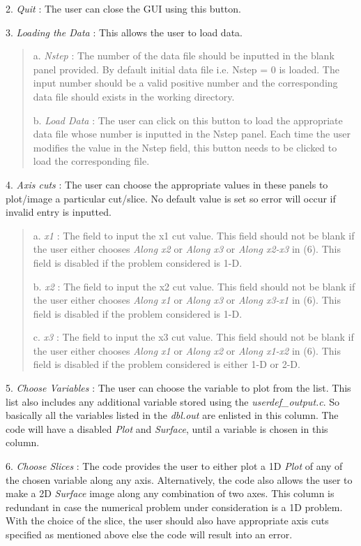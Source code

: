 \documentclass[letterpaper,10pt,english]{sphinxmanual}
\begin{document}
2. \emph{Quit} : The user can close the GUI using this
button.

3. \emph{Loading the Data} :  This allows the user to load
data.
\begin{quote}

a. \emph{Nstep} : The number of the data file should be inputted in the
blank panel provided. By default initial data file i.e. Nstep = 0 is
loaded. The input number should be a valid positive number and the
corresponding data file should exists in the working directory.

b. \emph{Load Data} : The user can click on this button to load the
appropriate data file whose number is inputted in the Nstep
panel. Each time the user modifies the value in the Nstep field, this
button needs to be clicked to load the corresponding file.
\end{quote}

4. \emph{Axis cuts} : The user can choose the appropriate values in these
panels to plot/image a particular cut/slice.
No default value is set so error will occur if invalid entry is inputted.
\begin{quote}

a. \emph{x1} : The field to input the x1 cut value. This field should not be
blank if the user either chooses \emph{Along x2} or \emph{Along x3} or \emph{Along
x2-x3} in (6). This field is disabled if the problem considered is
1-D.

b. \emph{x2} : The field to input the x2 cut value. This field should not
be blank if the user either chooses \emph{Along x1} or \emph{Along x3} or
\emph{Along x3-x1} in (6). This field is disabled if the
problem considered is 1-D.

c. \emph{x3} : The field to input the x3 cut value. This field should not
be blank if the user either chooses \emph{Along x1} or \emph{Along x2} or
\emph{Along x1-x2} in (6).  This field is disabled if the
problem considered is either 1-D or 2-D.
\end{quote}

5. \emph{Choose Variables} : The user can choose the variable to plot from the list. This list also includes any additional variable stored using the \emph{userdef\_output.c}. So basically all the variables
listed in the \emph{dbl.out} are enlisted in this column. The code will
have a disabled \emph{Plot} and  \emph{Surface}, until a variable is chosen in this column.

6. \emph{Choose Slices} : The code provides the user to either plot a 1D \emph{Plot} of any of the chosen variable along any axis. Alternatively, the code also allows the user to make a 2D  \emph{Surface} image along
any combination of two axes. This column is redundant in case the
numerical problem under consideration is a 1D problem. With the choice
of the slice, the user should also have appropriate axis cuts
specified as mentioned above else the code will result into an error.
\end{document}
